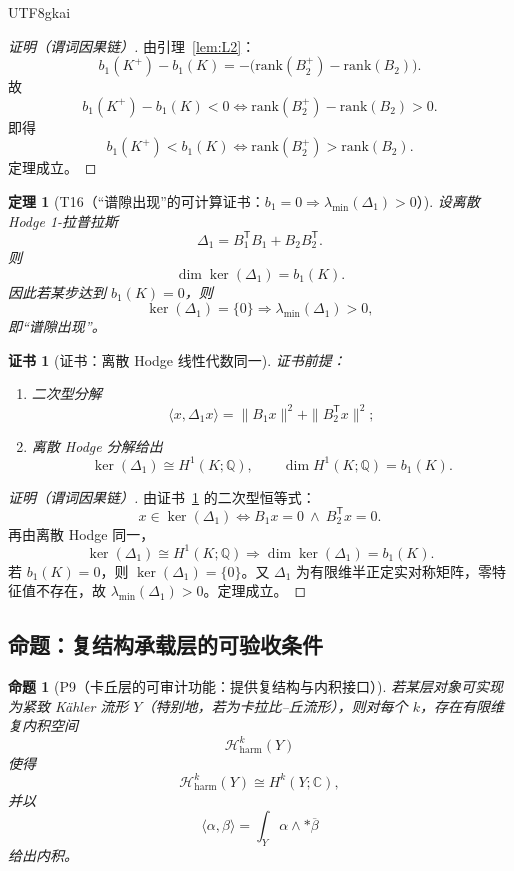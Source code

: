 \documentclass[12pt]{article}
\newtheorem{theorem}{定理}[section]
\newtheorem{proposition}{命题}[section]
\newtheorem{Certificate}{证书}[section]
\newcommand{\QQ}{\mathbb{Q}}
\begin{document}
\begin{CJK*}{UTF8}{gkai}
\begin{proof}[证明（谓词因果链）]
由引理~\ref{lem:L2}：
\[
b_1(K^+)-b_1(K)= -\big(\mathrm{rank}(B_2^+)-\mathrm{rank}(B_2)\big).
\]
故
\[
b_1(K^+)-b_1(K)<0
\Longleftrightarrow
\mathrm{rank}(B_2^+)-\mathrm{rank}(B_2)>0.
\]
即得
\[
b_1(K^+)<b_1(K)\Longleftrightarrow \mathrm{rank}(B_2^+)>\mathrm{rank}(B_2).
\]
定理成立。
\end{proof}

\begin{theorem}[T16（“谱隙出现”的可计算证书：$b_1=0\Rightarrow \lambda_{\min}(\Delta_1)>0$）]
\label{thm:T16}
设离散 Hodge 1-拉普拉斯
\[
\Delta_1 = B_1^{\mathsf T}B_1 + B_2B_2^{\mathsf T}.
\]
则
\[
\dim\ker(\Delta_1)=b_1(K).
\]
因此若某步达到 $b_1(K)=0$，则
\[
\ker(\Delta_1)=\{0\}\Rightarrow \lambda_{\min}(\Delta_1)>0,
\]
即“谱隙出现”。
\end{theorem}

\begin{Certificate}[证书：离散 Hodge 线性代数同一]
\label{cert:T16}
证书前提：
\begin{enumerate}
\item 二次型分解
\[
\langle x,\Delta_1 x\rangle=\|B_1x\|^2+\|B_2^{\mathsf T}x\|^2;
\]
\item 离散 Hodge 分解给出
\[
\ker(\Delta_1)\cong H^1(K;\QQ),\qquad \dim H^1(K;\QQ)=b_1(K).
\]
\end{enumerate}
\end{Certificate}

\begin{proof}[证明（谓词因果链）]
由证书~\ref{cert:T16} 的二次型恒等式：
\[
x\in\ker(\Delta_1)\Longleftrightarrow B_1x=0\ \wedge\ B_2^{\mathsf T}x=0.
\]
再由离散 Hodge 同一，
\[
\ker(\Delta_1)\cong H^1(K;\QQ)\Longrightarrow \dim\ker(\Delta_1)=b_1(K).
\]
若 $b_1(K)=0$，则 $\ker(\Delta_1)=\{0\}$。又 $\Delta_1$ 为有限维半正定实对称矩阵，零特征值不存在，故 $\lambda_{\min}(\Delta_1)>0$。定理成立。
\end{proof}

\subsection{命题：复结构承载层的可验收条件}

\begin{proposition}[P9（卡丘层的可审计功能：提供复结构与内积接口）]
\label{prop:P9}
若某层对象可实现为紧致 K\"ahler 流形 $Y$（特别地，若为卡拉比--丘流形），则对每个 $k$，存在有限维复内积空间
\[
\mathcal H^k_{\mathrm{harm}}(Y)
\]
使得
\[
\mathcal H^k_{\mathrm{harm}}(Y)\cong H^k(Y;\mathbb C),
\]
并以
\[
\langle \alpha,\beta\rangle=\int_Y \alpha\wedge *\overline{\beta}
\]
给出内积。
\end{proposition}


\end{CJK*}
\end{document}
